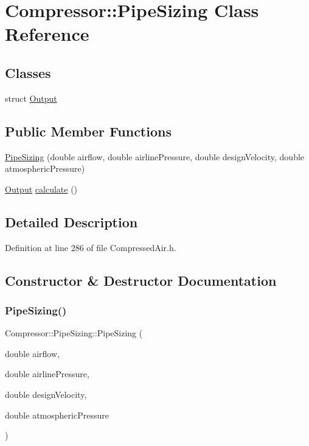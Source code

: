 \hypertarget{class_compressor_1_1_pipe_sizing}{}\section{Compressor\+:\+:Pipe\+Sizing Class Reference}
\label{class_compressor_1_1_pipe_sizing}
\subsection*{Classes}
\begin{DoxyCompactItemize}
\item 
struct \hyperlink{struct_compressor_1_1_pipe_sizing_1_1_output}{Output}
\end{DoxyCompactItemize}
\subsection*{Public Member Functions}
\begin{DoxyCompactItemize}
\item 
\hyperlink{class_compressor_1_1_pipe_sizing_a63d7a8e0780e80938489f160b5996abb}{Pipe\+Sizing} (double airflow, double airline\+Pressure, double design\+Velocity, double atmospheric\+Pressure)
\item 
\hyperlink{struct_compressor_1_1_pipe_sizing_1_1_output}{Output} \hyperlink{class_compressor_1_1_pipe_sizing_a9212c8d52ff658c412752cee18d6b28d}{calculate} ()
\end{DoxyCompactItemize}


\subsection{Detailed Description}


Definition at line 286 of file Compressed\+Air.\+h.



\subsection{Constructor \& Destructor Documentation}
\mbox{\label{class_compressor_1_1_pipe_sizing_a63d7a8e0780e80938489f160b5996abb}} 
\subsubsection{\texorpdfstring{Pipe\+Sizing()}{PipeSizing()}}
{\footnotesize\ttfamily Compressor\+::\+Pipe\+Sizing\+::\+Pipe\+Sizing (\begin{DoxyParamCaption}\item[{double}]{airflow,  }\item[{double}]{airline\+Pressure,  }\item[{double}]{design\+Velocity,  }\item[{double}]{atmospheric\+Pressure }\end{DoxyParamCaption})}

